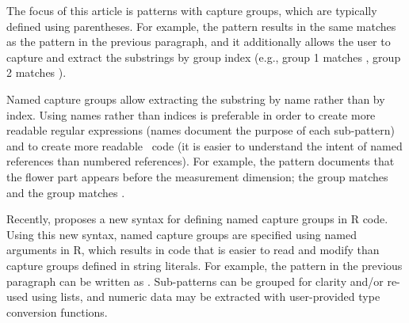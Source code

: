 The focus of this article is patterns with capture groups, which are
typically defined using parentheses. For example, the pattern
 results in the same matches as the pattern in the
previous paragraph, and it additionally allows the user to capture and
extract the substrings by group index (e.g., group 1 matches
, group 2 matches ).

Named capture groups allow extracting the substring by name rather
than by index. Using names rather than indices is preferable in order to
create more readable regular expressions (names document the purpose
of each sub-pattern) and to create more readable \R\ code (it is
easier to understand the intent of named references than numbered
references). For example, the pattern
 documents that the flower part
appears before the measurement dimension; the  group
matches  and the  group matches
.

Recently, \citet{HOCKING2019-namedCapture} proposes a new syntax for
defining named capture groups in R code. Using this new syntax,
named capture groups are specified using named arguments in R,
which results in code that is easier to read and modify than
capture groups defined in string literals. For example, the
pattern in the previous paragraph can be written as 
 .
Sub-patterns can be grouped for
clarity and/or re-used using
lists, and numeric data may be extracted with user-provided
type conversion functions.

